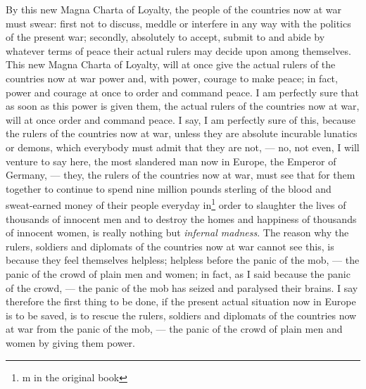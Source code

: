 By this new Magna Charta of Loyalty, the people of the countries now at war must swear: first not to discuss, meddle or interfere in any way with the politics of the present war; secondly, absolutely to accept, submit to and abide by whatever terms of peace their actual rulers may decide upon among themselves.
This new Magna Charta of Loyalty, will at once give the actual rulers of the countries now at war power and, with power, courage to make peace; in fact, power and courage at once to order and command peace.
I am perfectly sure that as soon as this power is given them, the actual rulers of the countries now at war, will at once order and command peace.
I say, I am perfectly sure of this, because the rulers of the countries now at war, unless they are absolute incurable lunatics or demons, which everybody must admit that they are not, --- no, not even, I will venture to say here, the most slandered man now in Europe, the Emperor of Germany, --- they, the rulers of the countries now at war, must see that for them together to continue to spend nine million pounds sterling of the blood and sweat-earned money  of their people everyday in\footnote{m in the original book} order to slaughter the lives of thousands of innocent men and to destroy the homes and happiness of thousands of innocent women, is really nothing but \emph{infernal madness}.
The reason why the rulers, soldiers and diplomats of the countries now at war cannot see this, is because they feel themselves helpless; helpless before the panic of the mob, --- the panic of the crowd of plain men and women; in fact, as I said because the panic of the crowd, --- the panic of the mob has seized and paralysed their brains.
I say therefore the first thing to be done, if the present actual situation now in Europe is to be saved, is to rescue the rulers, soldiers and diplomats of the countries now at war from the panic of the mob, --- the panic of the crowd of plain men and women by giving them power.

